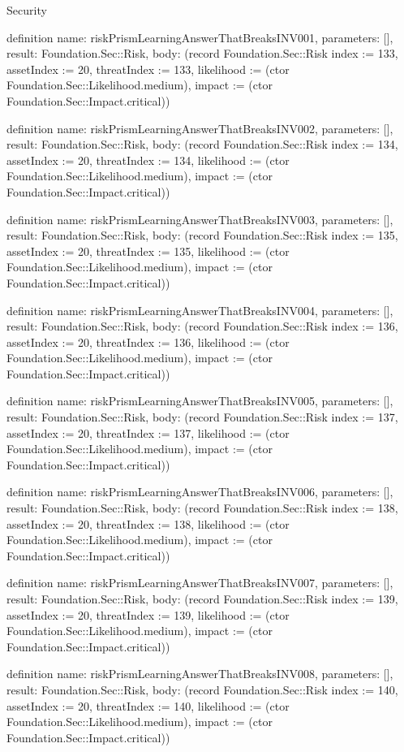 \begin{lexlean}{Security}
\begin{semanticmodule}
definition{
  name: riskPrismLearningAnswerThatBreaksINV001,
  parameters: [],
  result: Foundation.Sec::Risk,
  body: (record Foundation.Sec::Risk {index := 133, assetIndex := 20, threatIndex := 133, likelihood := (ctor Foundation.Sec::Likelihood.medium), impact := (ctor Foundation.Sec::Impact.critical)})
}

definition{
  name: riskPrismLearningAnswerThatBreaksINV002,
  parameters: [],
  result: Foundation.Sec::Risk,
  body: (record Foundation.Sec::Risk {index := 134, assetIndex := 20, threatIndex := 134, likelihood := (ctor Foundation.Sec::Likelihood.medium), impact := (ctor Foundation.Sec::Impact.critical)})
}

definition{
  name: riskPrismLearningAnswerThatBreaksINV003,
  parameters: [],
  result: Foundation.Sec::Risk,
  body: (record Foundation.Sec::Risk {index := 135, assetIndex := 20, threatIndex := 135, likelihood := (ctor Foundation.Sec::Likelihood.medium), impact := (ctor Foundation.Sec::Impact.critical)})
}

definition{
  name: riskPrismLearningAnswerThatBreaksINV004,
  parameters: [],
  result: Foundation.Sec::Risk,
  body: (record Foundation.Sec::Risk {index := 136, assetIndex := 20, threatIndex := 136, likelihood := (ctor Foundation.Sec::Likelihood.medium), impact := (ctor Foundation.Sec::Impact.critical)})
}

definition{
  name: riskPrismLearningAnswerThatBreaksINV005,
  parameters: [],
  result: Foundation.Sec::Risk,
  body: (record Foundation.Sec::Risk {index := 137, assetIndex := 20, threatIndex := 137, likelihood := (ctor Foundation.Sec::Likelihood.medium), impact := (ctor Foundation.Sec::Impact.critical)})
}

definition{
  name: riskPrismLearningAnswerThatBreaksINV006,
  parameters: [],
  result: Foundation.Sec::Risk,
  body: (record Foundation.Sec::Risk {index := 138, assetIndex := 20, threatIndex := 138, likelihood := (ctor Foundation.Sec::Likelihood.medium), impact := (ctor Foundation.Sec::Impact.critical)})
}

definition{
  name: riskPrismLearningAnswerThatBreaksINV007,
  parameters: [],
  result: Foundation.Sec::Risk,
  body: (record Foundation.Sec::Risk {index := 139, assetIndex := 20, threatIndex := 139, likelihood := (ctor Foundation.Sec::Likelihood.medium), impact := (ctor Foundation.Sec::Impact.critical)})
}

definition{
  name: riskPrismLearningAnswerThatBreaksINV008,
  parameters: [],
  result: Foundation.Sec::Risk,
  body: (record Foundation.Sec::Risk {index := 140, assetIndex := 20, threatIndex := 140, likelihood := (ctor Foundation.Sec::Likelihood.medium), impact := (ctor Foundation.Sec::Impact.critical)})
}


\end{semanticmodule}
\end{lexlean}
